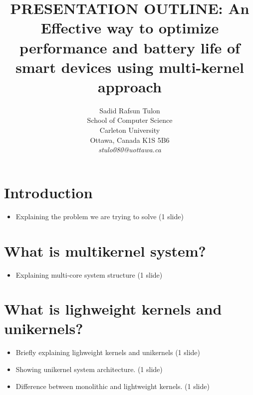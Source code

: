\documentclass[11pt]{article}       %
\newenvironment{slide}[1]        {\section{#1} \begin{itemize}}%
                                 {\end{itemize}}
\begin{document}


\title{PRESENTATION OUTLINE: An Effective way to optimize
performance and battery life of smart devices using
multi-kernel approach
}


\author{
Sadid Rafsun Tulon\\
School of Computer Science\\
Carleton University\\
Ottawa, Canada K1S 5B6\\
{\em stulo080@uottawa.ca}
} %

\maketitle

\begin{slide}{Introduction}
\item Explaining the problem we are trying to solve (1 slide)
\end{slide}

\begin{slide}{What is multikernel system?}
\item Explaining multi-core system structure (1 slide)
\end{slide}

\begin{slide}{What is lighweight kernels and unikernels?}
\item Briefly explaining lighweight kernels and unikernels (1 slide)
\item Showing unikernel system architecture. (1 slide)
\item Difference between monolithic and lightweight kernels. (1 slide)

\end{slide}
\end{document}
